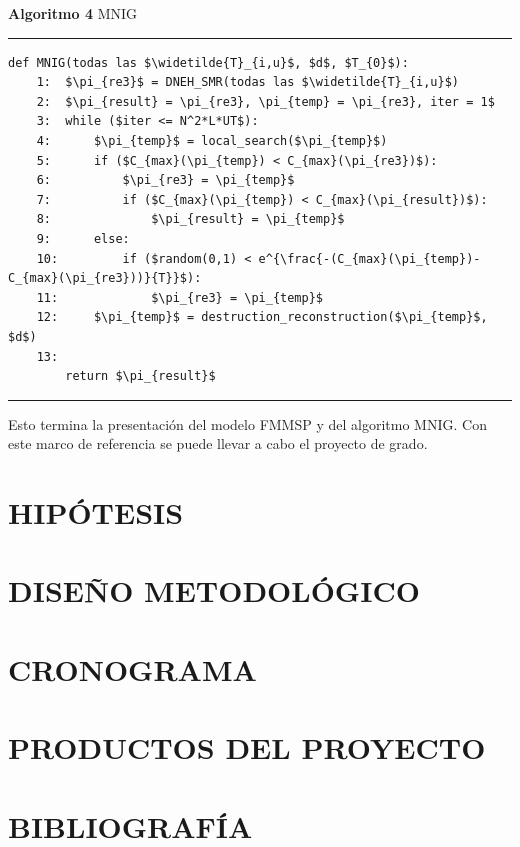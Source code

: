 \documentclass{article}
\begin{document}
\textbf{Algoritmo 4} MNIG

\noindent\noindent
\rule{\linewidth}{0.4pt}

\begin{lstlisting}[mathescape=true]
    def MNIG(todas las $\widetilde{T}_{i,u}$, $d$, $T_{0}$):
    1:  $\pi_{re3}$ = DNEH_SMR(todas las $\widetilde{T}_{i,u}$)
    2:  $\pi_{result} = \pi_{re3}, \pi_{temp} = \pi_{re3}, iter = 1$
    3:  while ($iter <= N^2*L*UT$):
    4:      $\pi_{temp}$ = local_search($\pi_{temp}$)
    5:      if ($C_{max}(\pi_{temp}) < C_{max}(\pi_{re3})$):
    6:          $\pi_{re3} = \pi_{temp}$
    7:          if ($C_{max}(\pi_{temp}) < C_{max}(\pi_{result})$):
    8:              $\pi_{result} = \pi_{temp}$
    9:      else:
    10:         if ($random(0,1) < e^{\frac{-(C_{max}(\pi_{temp})-C_{max}(\pi_{re3}))}{T}}$):
    11:             $\pi_{re3} = \pi_{temp}$
    12:     $\pi_{temp}$ = destruction_reconstruction($\pi_{temp}$, $d$)
    13:
        return $\pi_{result}$
\end{lstlisting}

\noindent\noindent
\rule{\linewidth}{0.4pt}

\vspace{\baselineskip}
Esto termina la presentación del modelo FMMSP y del algoritmo MNIG. Con este
marco de referencia se puede llevar a cabo el proyecto de grado.

\section{HIPÓTESIS}



\section{DISEÑO METODOLÓGICO}



\section{CRONOGRAMA}



\section{PRODUCTOS DEL PROYECTO}



\section{BIBLIOGRAFÍA}

\printbibliography[heading=none]
\end{document}
